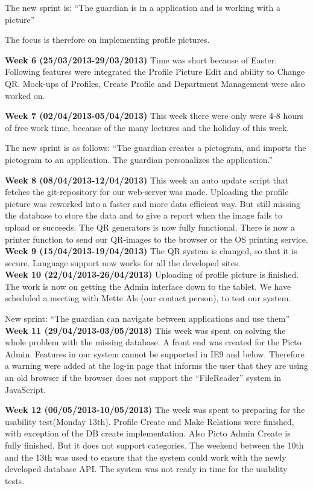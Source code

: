 The new sprint is:
``The guardian is in a application and is working with a picture''

The focus is therefore on implementing profile pictures. 

\textbf{Week 6 (25/03/2013-29/03/2013)}
Time was short because of Easter. 
Following features were integrated the Profile Picture Edit and ability to Change QR.
Mock-ups of Profiles, Create Profile and Department Management were also worked on.    

\textbf{Week 7 (02/04/2013-05/04/2013)}
This week there were only were 4-8 hours of free work time, because of the many lectures and the holiday of this week.

The new sprint is as follows: 
``The guardian creates a pictogram, and imports the pictogram to an application. The guardian personalizes the application.''

\textbf{Week 8 (08/04/2013-12/04/2013)}
This week an auto update script that fetches the git-repository for our web-server was made.
Uploading the profile picture was reworked into a faster and more data efficient way. 
But still missing the database to store the data and to give a report when the image fails to upload or succeeds.
The QR generators is now fully functional. 
There is now a printer function to send our QR-images to the browser or the OS printing service.
\\
\textbf{Week 9 (15/04/2013-19/04/2013)}
The QR system is changed, so that it is secure. 
Language support now works for all the developed sites. \\

\textbf{Week 10 (22/04/2013-26/04/2013)}
Uploading of profile picture is finished.
The work is now on getting the Admin interface down to the tablet.
We have scheduled a meeting with Mette Als (our contact person), to test our system. 

New sprint: 
``The guardian can navigate between applications and use them''
\\
\textbf{Week 11 (29/04/2013-03/05/2013)}
This week was spent on solving the whole problem with the missing database.
A front end was created for the Picto Admin. Features  in our system cannot be supported in IE9 and below. Therefore a warning were added at the log-in page that informs the user that they are using an old browser if the browser does not support the ``FileReader'' system in JavaScript.

\textbf{Week 12 (06/05/2013-10/05/2013)}
The week was spent to preparing for the usability test(Monday 13th).
Profile Create and Make Relations were finished, with exception of the DB create implementation. 
Also Picto Admin Create is fully finished. But it does not support categories. 
The weekend between the 10th and the 13th was used to ensure that the system could work with the newly developed database API. The system was not ready in time for the usability tests. 

